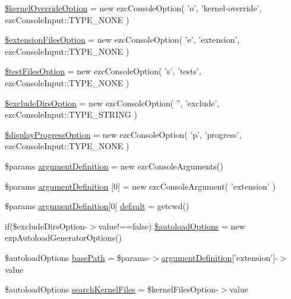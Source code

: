 \begin{DoxyCompactItemize}
\item 
\hyperlink{ezpgenerateautoloads_8php_a67e31a42e7cb071e5c02df2261d6594a}{\$kernel\-Override\-Option} = new ezc\-Console\-Option( 'o', 'kernel-\/override', ezc\-Console\-Input\-::\-T\-Y\-P\-E\-\_\-\-N\-O\-N\-E )
\item 
\hyperlink{ezpgenerateautoloads_8php_a35b967cec5da82cfa9989e036ad50642}{\$extension\-Files\-Option} = new ezc\-Console\-Option( 'e', 'extension', ezc\-Console\-Input\-::\-T\-Y\-P\-E\-\_\-\-N\-O\-N\-E )
\item 
\hyperlink{ezpgenerateautoloads_8php_a42bc54b597a301809a0bdbec1c8f1ee6}{\$test\-Files\-Option} = new ezc\-Console\-Option( 's', 'tests', ezc\-Console\-Input\-::\-T\-Y\-P\-E\-\_\-\-N\-O\-N\-E )
\item 
\hyperlink{ezpgenerateautoloads_8php_ad444c7af1932b7a85e8351702c783790}{\$exclude\-Dirs\-Option} = new ezc\-Console\-Option( '', 'exclude', ezc\-Console\-Input\-::\-T\-Y\-P\-E\-\_\-\-S\-T\-R\-I\-N\-G )
\item 
\hyperlink{ezpgenerateautoloads_8php_a407bf0b4ef42d32212f29ac7c8e8a96e}{\$display\-Progress\-Option} = new ezc\-Console\-Option( 'p', 'progress', ezc\-Console\-Input\-::\-T\-Y\-P\-E\-\_\-\-N\-O\-N\-E )
\item 
\$params \hyperlink{ezpgenerateautoloads_8php_ab9a0a1710f335bc48a13e8a94802be23}{argument\-Definition} = new ezc\-Console\-Arguments()
\item 
\$params \hyperlink{ezpgenerateautoloads_8php_aed0ba19f5204d9659e823271642a6594}{argument\-Definition} \mbox{[}0\mbox{]} = new ezc\-Console\-Argument( 'extension' )
\item 
\$params \hyperlink{ezpgenerateautoloads_8php_aed0ba19f5204d9659e823271642a6594}{argument\-Definition}\mbox{[}0\mbox{]} \hyperlink{ezpgenerateautoloads_8php_a7cbde127000429b4c1ee76be227eca44}{default} = getcwd()
\item 
if(\$exclude\-Dirs\-Option-\/$>$value!==false) \hyperlink{ezpgenerateautoloads_8php_a11b2b8d92ed8fe93c2e53197e661142c}{\$autoload\-Options} = new ezp\-Autoload\-Generator\-Options()
\item 
\$autoload\-Options \hyperlink{ezpgenerateautoloads_8php_a29816a8455ff45c83cd2e389735c8207}{base\-Path} = \$params-\/$>$\hyperlink{ezpgenerateautoloads_8php_aed0ba19f5204d9659e823271642a6594}{argument\-Definition}\mbox{[}'extension'\mbox{]}-\/$>$value
\item 
\$autoload\-Options \hyperlink{ezpgenerateautoloads_8php_aab46cc9fff71273094aafac8ebd689d4}{search\-Kernel\-Files} = \$kernel\-Files\-Option-\/$>$value

\end{DoxyCompactItemize}
